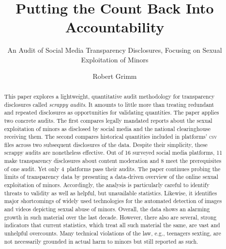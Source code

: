 \documentclass[nonacm,screen]{acmart}
\newcommand\V[1]{\textsc{\MakeLowercase{#1}}}
\begin{document}
\title{Putting the Count Back Into Accountability}
\subtitle{An Audit of Social Media Transparency Disclosures,
    Focusing on Sexual Exploitation of Minors}

\author{Robert Grimm}


\begin{abstract}
This paper explores a lightweight, quantitative audit methodology for
transparency disclosures called \emph{scrappy audits}. It amounts to little more
than treating redundant and repeated disclosures as opportunities for validating
quantities. The paper applies two concrete audits. The first compares legally
mandated reports about the sexual exploitation of minors as disclosed by social
media and the national clearinghouse receiving them. The second compares
historical quantities included in platforms' \V{CSV} files across two subsequent
disclosures of the data. Despite their simplicity, these scrappy audits are
nonetheless effective. Out of 16 surveyed social media platforms, 11 make
transparency disclosures about content moderation and 8 meet the prerequisites
of one audit. Yet only 4~platforms pass their audits. The paper continues
probing the limits of transparency data by presenting a data-driven overview of
the online sexual exploitation of minors. Accordingly, the analysis is
particularly careful to identify threats to validity as well as helpful, but
unavailable statistics. Likewise, it identifies major shortcomings of widely
used technologies for the automated detection of images and videos depicting
sexual abuse of minors. Overall, the data shows an alarming growth in such
material over the last decade. However, there also are several, strong
indicators that current statistics, which treat all such material the same, are
vast and unhelpful overcounts. Many technical violations of the law, e.g.,
teenagers sexting, are not necessarily grounded in actual harm to minors but
still reported as such.
\end{abstract}

\maketitle
\end{document}

